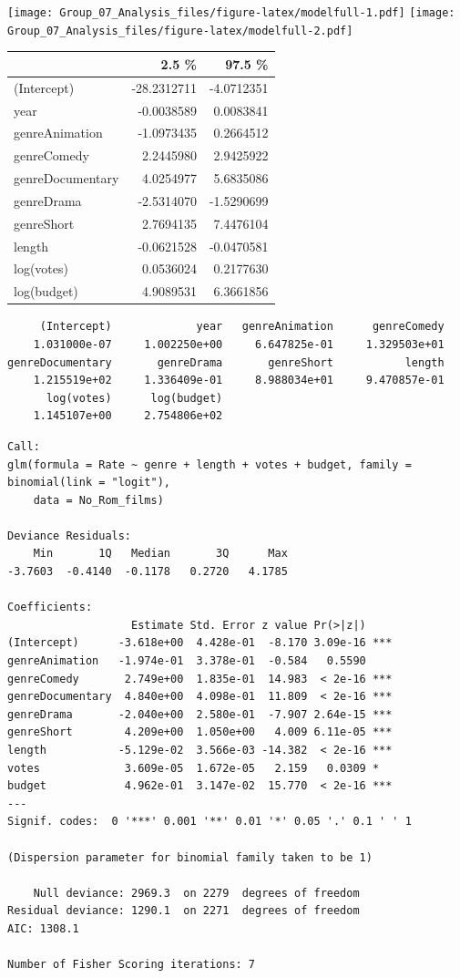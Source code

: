 \documentclass[
]{article}
\begin{document}
\texttt{[image: Group\_07\_Analysis\_files/figure-latex/modelfull-1.pdf]}
\texttt{[image: Group\_07\_Analysis\_files/figure-latex/modelfull-2.pdf]}

\begin{table}
\centering
\begin{tabular}{l|r|r}
\hline
  & 2.5 \% & 97.5 \%\\
\hline
(Intercept) & -28.2312711 & -4.0712351\\
\hline
year & -0.0038589 & 0.0083841\\
\hline
genreAnimation & -1.0973435 & 0.2664512\\
\hline
genreComedy & 2.2445980 & 2.9425922\\
\hline
genreDocumentary & 4.0254977 & 5.6835086\\
\hline
genreDrama & -2.5314070 & -1.5290699\\
\hline
genreShort & 2.7694135 & 7.4476104\\
\hline
length & -0.0621528 & -0.0470581\\
\hline
log(votes) & 0.0536024 & 0.2177630\\
\hline
log(budget) & 4.9089531 & 6.3661856\\
\hline
\end{tabular}
\end{table}

\begin{verbatim}
     (Intercept)             year   genreAnimation      genreComedy 
    1.031000e-07     1.002250e+00     6.647825e-01     1.329503e+01 
genreDocumentary       genreDrama       genreShort           length 
    1.215519e+02     1.336409e-01     8.988034e+01     9.470857e-01 
      log(votes)      log(budget) 
    1.145107e+00     2.754806e+02 
\end{verbatim}

\begin{verbatim}
Call:
glm(formula = Rate ~ genre + length + votes + budget, family = binomial(link = "logit"), 
    data = No_Rom_films)

Deviance Residuals: 
    Min       1Q   Median       3Q      Max  
-3.7603  -0.4140  -0.1178   0.2720   4.1785  

Coefficients:
                   Estimate Std. Error z value Pr(>|z|)    
(Intercept)      -3.618e+00  4.428e-01  -8.170 3.09e-16 ***
genreAnimation   -1.974e-01  3.378e-01  -0.584   0.5590    
genreComedy       2.749e+00  1.835e-01  14.983  < 2e-16 ***
genreDocumentary  4.840e+00  4.098e-01  11.809  < 2e-16 ***
genreDrama       -2.040e+00  2.580e-01  -7.907 2.64e-15 ***
genreShort        4.209e+00  1.050e+00   4.009 6.11e-05 ***
length           -5.129e-02  3.566e-03 -14.382  < 2e-16 ***
votes             3.609e-05  1.672e-05   2.159   0.0309 *  
budget            4.962e-01  3.147e-02  15.770  < 2e-16 ***
---
Signif. codes:  0 '***' 0.001 '**' 0.01 '*' 0.05 '.' 0.1 ' ' 1

(Dispersion parameter for binomial family taken to be 1)

    Null deviance: 2969.3  on 2279  degrees of freedom
Residual deviance: 1290.1  on 2271  degrees of freedom
AIC: 1308.1

Number of Fisher Scoring iterations: 7
\end{verbatim}
\end{document}
